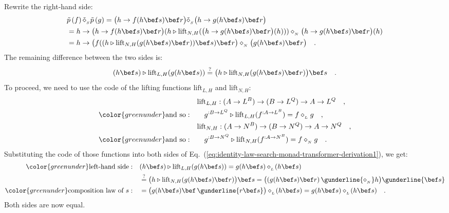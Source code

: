 Rewrite the right-hand side:
\begin{align*}
 & \tilde{p}\left(f\right)\tilde{\diamond}_{_{S}}\tilde{p}\left(g\right)=\big(h\rightarrow f(h\bef s)\bef r\big)\tilde{\diamond}_{_{S}}\big(h\rightarrow g(h\bef s)\bef r\big)\\
 & =h\rightarrow\big(h\rightarrow f(h\bef s)\bef r\big)(h\triangleright\text{lift}_{N,H}(\big(h\rightarrow g(h\bef s)\bef r\big)(h)))\diamond_{_{N}}\big(h\rightarrow g(h\bef s)\bef r\big)(h)\\
 & =h\rightarrow\big(f((h\triangleright\text{lift}_{N,H}(g(h\bef s)\bef r))\bef s)\bef r\big)\diamond_{_{N}}\big(g(h\bef s)\bef r\big)\quad.
\end{align*}
The remaining difference between the two sides is:
\begin{equation}
(h\bef s)\triangleright\text{lift}_{L,H}(g(h\bef s))\overset{?}{=}\big(h\triangleright\text{lift}_{N,H}(g(h\bef s)\bef r)\big)\bef s\quad.\label{eq:identity-law-search-monad-transformer-derivation1}
\end{equation}
To proceed, we need to use the code of the lifting functions $\text{lift}_{L,H}$
and $\text{lift}_{N,H}$:
\begin{align*}
 & \text{lift}_{L,H}:(A\rightarrow L^{B})\rightarrow(B\rightarrow L^{Q})\rightarrow A\rightarrow L^{Q}\quad,\\
{\color{greenunder}\text{and so}:}\quad & \quad g^{:B\rightarrow L^{Q}}\triangleright\text{lift}_{L,H}(f^{:A\rightarrow L^{B}})=f\diamond_{_{L}}g\quad,\\
 & \text{lift}_{N,H}:(A\rightarrow N^{B})\rightarrow(B\rightarrow N^{Q})\rightarrow A\rightarrow N^{Q}\quad,\\
{\color{greenunder}\text{and so}:}\quad & \quad g^{:B\rightarrow N^{Q}}\triangleright\text{lift}_{N,H}(f^{:A\rightarrow N^{B}})=f\diamond_{_{N}}g\quad.
\end{align*}
Substituting the code of those functions into both sides of Eq.~(\ref{eq:identity-law-search-monad-transformer-derivation1}),
we get:
\begin{align*}
{\color{greenunder}\text{left-hand side}:}\quad & (h\bef s)\triangleright\text{lift}_{L,H}(g(h\bef s))=g(h\bef s)\diamond_{_{L}}\!(h\bef s)\\
 & \overset{?}{=}\big(h\triangleright\text{lift}_{N,H}(g(h\bef s)\bef r)\big)\bef s=\big((g(h\bef s)\bef r)\,\gunderline{\diamond_{_{N}}}h\big)\gunderline{\bef s}\\
{\color{greenunder}\text{composition law of }s:}\quad & =\big(g(h\bef s)\bef\,\gunderline{r\bef s}\big)\diamond_{_{L}}\!(h\bef s)=g(h\bef s)\diamond_{_{L}}\!(h\bef s)\quad.
\end{align*}
Both sides are now equal.


